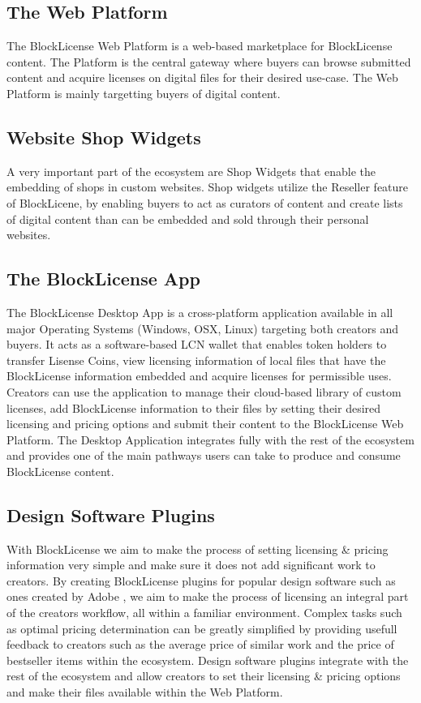 \subsection{The Web Platform}

The BlockLicense Web Platform is a web-based marketplace for BlockLicense content. The Platform is the central gateway where buyers can browse submitted content and acquire licenses on digital files for their desired use-case. The Web Platform is mainly targetting buyers of digital content.

\subsection{Website Shop Widgets}
A very important part of the ecosystem are Shop Widgets that enable the embedding of shops in custom websites. Shop widgets utilize the Reseller feature of BlockLicene, by enabling buyers to act as curators of content and create lists of digital content than can be embedded and sold through their personal websites.

\subsection{The BlockLicense App}

The BlockLicense Desktop App is a cross-platform application available in all major Operating Systems (Windows, OSX, Linux) targeting both creators and buyers. It acts as a software-based LCN wallet that enables token holders to transfer Lisense Coins, view licensing information of local files that have the BlockLicense information embedded and acquire licenses for permissible uses. Creators can use the application to manage their cloud-based library of custom licenses, add BlockLicense information to their files by setting their desired licensing and pricing options and submit their content to the BlockLicense Web Platform. The Desktop Application integrates fully with the rest of the ecosystem and provides one of the main pathways users can take to produce and consume BlockLicense content.

\subsection{Design Software Plugins}

With BlockLicense we aim to make the process of setting licensing \& pricing information very simple and make sure it does not add significant work to creators. By creating BlockLicense plugins for popular design software such as ones created by Adobe \cite{adobe}, we aim to make the process of licensing an integral part of the creators workflow, all within a familiar environment. Complex tasks such as optimal pricing determination can be greatly simplified by providing usefull feedback to creators such as the average price of similar work and the price of bestseller items within the ecosystem. Design software plugins integrate with the rest of the ecosystem and allow creators to set their licensing \& pricing options and make their files available within the Web Platform.



